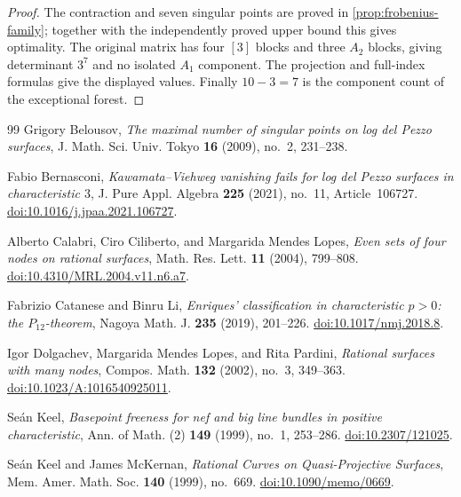 \documentclass[11pt,reqno]{amsart}
\theoremstyle{definition}
\theoremstyle{remark}
\numberwithin{equation}{section}
\begin{document}
\begin{proof}
The contraction and seven singular points are proved in
\cref{prop:frobenius-family}; together with the independently
proved upper bound this gives optimality. The original matrix has four $[3]$
blocks and three $A_2$ blocks, giving determinant $3^7$ and no isolated
$A_1$ component. The projection and full-index formulas give the displayed
values. Finally $10-3=7$ is the component count of the exceptional forest.
\end{proof}

\clearpage
\begin{thebibliography}{99}
Grigory Belousov, \emph{The maximal number of singular points on log del
Pezzo surfaces}, J. Math. Sci. Univ. Tokyo \textbf{16} (2009), no.~2,
231--238.

Fabio Bernasconi, \emph{Kawamata--Viehweg vanishing fails for log del Pezzo
surfaces in characteristic $3$}, J. Pure Appl. Algebra \textbf{225}
(2021), no.~11, Article~106727.
\href{https://doi.org/10.1016/j.jpaa.2021.106727}{doi:10.1016/j.jpaa.2021.106727}.

Alberto Calabri, Ciro Ciliberto, and Margarida Mendes Lopes,
\emph{Even sets of four nodes on rational surfaces}, Math. Res. Lett.
\textbf{11} (2004), 799--808.
\href{https://doi.org/10.4310/MRL.2004.v11.n6.a7}{doi:10.4310/MRL.2004.v11.n6.a7}.

Fabrizio Catanese and Binru Li,
\emph{Enriques' classification in characteristic $p>0$: the $P_{12}$-theorem},
Nagoya Math. J. \textbf{235} (2019), 201--226.
\href{https://doi.org/10.1017/nmj.2018.8}{doi:10.1017/nmj.2018.8}.

Igor Dolgachev, Margarida Mendes Lopes, and Rita Pardini,
\emph{Rational surfaces with many nodes}, Compos. Math.
\textbf{132} (2002), no.~3, 349--363.
\href{https://doi.org/10.1023/A:1016540925011}{doi:10.1023/A:1016540925011}.

Se\'an Keel, \emph{Basepoint freeness for nef and big line bundles in positive
characteristic}, Ann. of Math. (2) \textbf{149} (1999), no.~1, 253--286.
\href{https://doi.org/10.2307/121025}{doi:10.2307/121025}.

Se\'an Keel and James McKernan, \emph{Rational Curves on Quasi-Projective
Surfaces}, Mem. Amer. Math. Soc. \textbf{140} (1999), no.~669.
\href{https://doi.org/10.1090/memo/0669}{doi:10.1090/memo/0669}.


\end{thebibliography}
\end{document}
